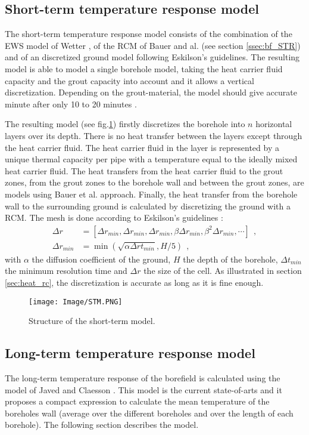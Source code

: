 \documentclass[a4paper,oneside,11pt]{report}
\begin{document}
{\subsection{Short-term temperature response model} \label{ssec:bf_imp_STM}
The short-term temperature response model consists of the combination of the EWS model of Wetter \cite{wet97}, of the RCM of Bauer and al. (see section \ref{ssec:bf_STR}) and of an discretized ground model following Eskilson's guidelines. The resulting model is able to model a single borehole model, taking the heat carrier fluid capacity and the grout capacity into account and it allows a vertical discretization. Depending on the grout-material, the model should give accurate minute after only 10 to 20 minutes \cite{bau10}.

The resulting model (see fig.\ref{fig:bf_STM}) firstly discretizes the borehole into $n$ horizontal layers over its depth. There is no heat transfer between the layers except through the heat carrier fluid. The heat carrier fluid in the layer is represented by a unique thermal capacity per pipe with a temperature equal to the ideally mixed heat carrier fluid. The heat transfers from the heat carrier fluid to the grout zones, from the grout zones to the borehole wall and between the grout zones, are models using Bauer et al. approach. Finally, the heat transfer from the borehole wall to the surrounding ground is calculated by discretizing the ground with a RCM. The mesh is done according to Eskilson's guidelines \cite{esk87}:
\begin{align*}
	\Delta r \ \ \ \  &= \left[ \Delta r_{min}, \Delta r_{min}, \Delta r_{min},\beta \Delta r_{min}, \beta^2 \Delta r_{min}, \cdots \right] \ \ , \\ 
	\Delta r_{min} &= \min( \sqrt{ \alpha \Delta r t_{min} } , H/5) \ \ ,
\end{align*}
with $\alpha$ the diffusion coefficient of the ground, $H$ the depth of the borehole, $\Delta t_{min}$ the minimum resolution time and $\Delta r$ the size of the cell. As illustrated in section \ref{sec:heat_rc}, the discretization is accurate as long as it is fine enough.

	\begin{figure}[hbtp] 
		\centering
		\texttt{[image: Image/STM.PNG]}
		\caption{Structure of the short-term model.}
		\label{fig:bf_STM}
	\end{figure}


\subsection{Long-term temperature response model} \label{ssec:bf_imp_LRM}
The long-term temperature response of the borefield is calculated using the model of Javed and Claesson \cite{jav12}. This model is the current state-of-arts and it proposes a compact expression to calculate the mean temperature of the boreholes wall (average over the different boreholes and over the length of each borehole). The following section describes the model.

}
\end{document}
